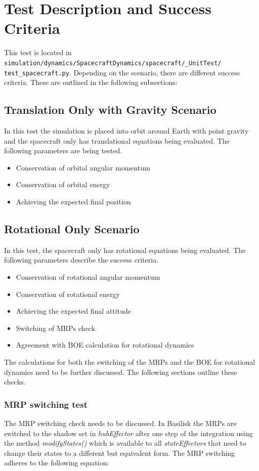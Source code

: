 
\section{Test Description and Success Criteria}
This test is located in \texttt{simulation/dynamics/SpacecraftDynamics/spacecraft/\_UnitTest/\newline
test\_spacecraft.py}. Depending on the scenario, there are different success criteria. These are outlined in the following subsections:
\subsection{Translation Only with Gravity Scenario}
In this test the simulation is placed into orbit around Earth with point gravity and the spacecraft only has translational equations being evaluated. The following parameters are being tested. 
\begin{itemize}
	\item Conservation of orbital angular momentum
	\item Conservation of orbital energy
	\item Achieving the expected final position
\end{itemize}

\subsection{Rotational Only Scenario}
In this test, the spacecraft only has rotational equations being evaluated. The following parameters describe the success criteria.
\begin{itemize}
\item Conservation of rotational angular momentum
\item Conservation of rotational energy
\item Achieving the expected final attitude
\item Switching of MRPs check
\item Agreement with BOE calculation for rotational dynamics
\end{itemize}
The calculations for both the switching of the MRPs and the BOE for rotational dynamics need to be further discussed. The following sections outline these checks.

\subsubsection{MRP switching test} 
The MRP switching check needs to be discussed. In Basilisk the MRPs are switched to the shadow set in \textit{hubEffector} after one step of the integration using the method \textit{modifyStates()} which is available to all \textit{stateEffectors} that need to change their states to a different but equivalent form. The MRP switching adheres to the following equation\cite{schaub}:

